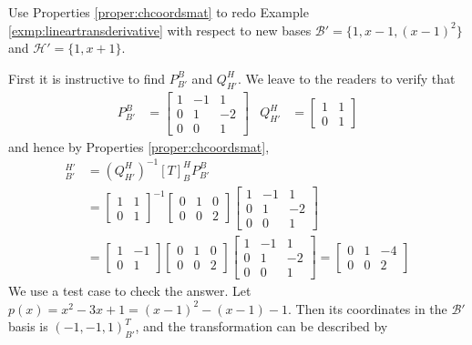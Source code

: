 \begin{exmp}
Use Properties \ref{proper:chcoordsmat} to redo Example \ref{exmp:lineartransderivative} with respect to new bases $\mathcal{B}' = \{1, x-1, (x-1)^2\}$ and $\mathcal{H}' = \{1, x+1\}$.
\end{exmp}
\begin{solution}
First it is instructive to find $P_{B'}^B$ and $Q_{H'}^H$. We leave to the readers to verify that
\begin{align*}
P_{B'}^B &= 
\begin{bmatrix}
1 & -1 & 1 \\
0 & 1 & -2\\
0 & 0 & 1
\end{bmatrix}
& Q_{H'}^H &=
\begin{bmatrix}
1 & 1 \\
0 & 1 
\end{bmatrix}
\end{align*}
and hence by Properties \ref{proper:chcoordsmat},
\begin{align*}
[T]_{B'}^{H'} &= (Q_{H'}^H)^{-1} [T]_B^H P_{B'}^B \\
&= \begin{bmatrix}
1 & 1 \\
0 & 1 
\end{bmatrix}^{-1}
\begin{bmatrix}
0 & 1 & 0 \\
0 & 0 & 2
\end{bmatrix}
\begin{bmatrix}
1 & -1 & 1 \\
0 & 1 & -2\\
0 & 0 & 1
\end{bmatrix} \\
&= \begin{bmatrix}
1 & -1 \\
0 & 1 
\end{bmatrix}
\begin{bmatrix}
0 & 1 & 0 \\
0 & 0 & 2
\end{bmatrix}
\begin{bmatrix}
1 & -1 & 1 \\
0 & 1 & -2\\
0 & 0 & 1
\end{bmatrix} =
\begin{bmatrix}
0 & 1 & -4 \\
0 & 0 & 2
\end{bmatrix}
\end{align*}
We use a test case to check the answer. Let $p(x) = x^2 - 3x + 1 = (x-1)^2 - (x-1) - 1$. Then its coordinates in the $\mathcal{B}'$ basis is $(-1,-1,1)^T_{B'}$, and the transformation can be described by 

\end{solution}
